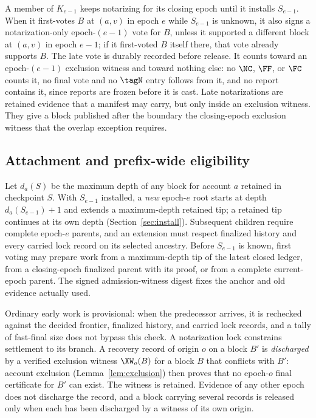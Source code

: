 A member of $K_{e-1}$ keeps notarizing for its closing epoch until it installs $S_{e-1}$. When it first-votes $B$ at $(a,v)$ in epoch $e$ while $S_{e-1}$ is unknown, it also signs a notarization-only epoch-$(e-1)$ vote for $B$, unless it supported a different block at $(a,v)$ in epoch $e-1$; if it first-voted $B$ itself there, that vote already supports $B$. The late vote is durably recorded before release. It counts toward an epoch-$(e-1)$ exclusion witness and toward nothing else: no $\NC$, $\FF$, or $\FC$ counts it, no final vote and no $\tagN$ entry follows from it, and no report contains it, since reports are frozen before it is cast. Late notarizations are retained evidence that a manifest may carry, but only inside an exclusion witness. They give a block published after the boundary the closing-epoch exclusion witness that the overlap exception requires.

\subsection{Attachment and prefix-wide eligibility}
\label{sec:eligibility}
Let $d_a(S)$ be the maximum depth of any block for account $a$ retained in checkpoint $S$. With $S_{e-1}$ installed, a \emph{new} epoch-$e$ root starts at depth $d_a(S_{e-1})+1$ and extends a maximum-depth retained tip; a retained tip continues at its own depth (Section~\ref{sec:install}). Subsequent children require complete epoch-$e$ parents, and an extension must respect finalized history and every carried lock record on its selected ancestry. Before $S_{e-1}$ is known, first voting may prepare work from a maximum-depth tip of the latest closed ledger, from a closing-epoch finalized parent with its proof, or from a complete current-epoch parent. The signed admission-witness digest fixes the anchor and old evidence actually used.

Ordinary early work is provisional: when the predecessor arrives, it is rechecked against the decided frontier, finalized history, and carried lock records, and a tally of fast-final size does not bypass this check. A notarization lock constrains settlement to its branch. A recovery record of origin $o$ on a block $B'$ is \emph{discharged} by a verified exclusion witness $\XW_o(B)$ for a block $B$ that conflicts with $B'$: account exclusion (Lemma~\ref{lem:exclusion}) then proves that no epoch-$o$ final certificate for $B'$ can exist. The witness is retained. Evidence of any other epoch does not discharge the record, and a block carrying several records is released only when each has been discharged by a witness of its own origin.

